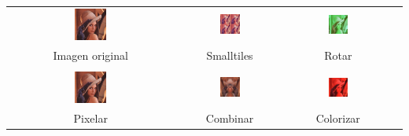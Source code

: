 \documentclass[a4paper, 12pt]{article}
\begin{document}
\begin{center}
 \begin{tabular}{cccc}
   \includegraphics[width=0.2\textwidth]{imagenes/lena.png} &
   \includegraphics[width=0.2\textwidth]{imagenes/lena-smalltiles.png} &
   \includegraphics[width=0.2\textwidth]{imagenes/lena-rotar-canales.png} \\
   Imagen original & Smalltiles & Rotar \\
   \\
   \includegraphics[width=0.2\textwidth]{imagenes/lena-pixelar.png} &
   \includegraphics[width=0.2\textwidth]{imagenes/lena-combinar.png} &
   \includegraphics[width=0.2\textwidth]{imagenes/lena-colorizar.png} \\
   Pixelar & Combinar & Colorizar \\
 \end{tabular}
\end{center}
\end{document}
